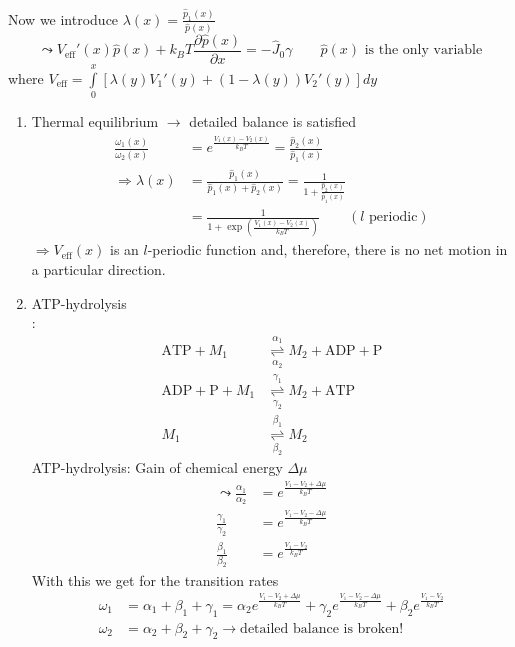 Now we introduce $\lambda(x)=\frac{\hat{p}_1(x)}{\hat{p}(x)}$
\begin{equation*}
	\leadsto V_\text{eff}'(x)\hat{p}(x)+k_BT\frac{\partial\hat{p}(x)}{\partial x}=-\hat{J}_0\gamma \qquad \text{$\hat{p}(x)$ is the only variable}
\end{equation*}
where $V_\text{eff}=\int\limits_0^x\left[\lambda(y)V_1'(y)+(1-\lambda(y))V_2'(y)\right]dy$
\begin{enumerate}[label={\arabic*)}]
	\item Thermal equilibrium $\to$ detailed balance is satisfied
		\begin{align*}
			\frac{\omega_1(x)}{\omega_2(x)}&=e^{\frac{V_1(x)-V_2(x)}{k_BT}}=\frac{\hat{p}_2(x)}{\hat{p}_1(x)}\\
			\Rightarrow \lambda(x)&=\frac{\hat{p}_1(x)}{\hat{p}_1(x)+\hat{p}_2(x)}=\frac{1}{1+\frac{\hat{p}_2(x)}{\hat{p}_1(x)}}\\
			&=\frac{1}{1+\exp\left(\frac{V_1(x)-V_2(x)}{k_BT}\right)} \qquad \left(l\text{ periodic}\right)
		\end{align*}
		$\Rightarrow V_\text{eff}(x)$ is an $l$-periodic function and, therefore, there is no net motion in a particular direction.
	\item ATP-hydrolysis\\
		\textbf{\underline{}}:
		\begin{align*}
			\text{ATP}+M_1&\overset{\alpha_1}{\underset{\alpha_2}{\rightleftharpoons}} M_2+\text{ADP}+\text{P}\\
			\text{ADP}+\text{P}+M_1&\overset{\gamma_1}{\underset{\gamma_2}{\rightleftharpoons}} M_2+\text{ATP}\\
			M_1&\overset{\beta_1}{\underset{\beta_2}{\rightleftharpoons}}M_2
		\end{align*}
		ATP-hydrolysis: Gain of chemical energy $\Delta\mu$
		\begin{align*}
			\leadsto \frac{\alpha_1}{\alpha_2}&=e^{\frac{V_1-V_2+\Delta\mu}{k_BT}}\\
			\frac{\gamma_1}{\gamma_2}&=e^{\frac{V_1-V_2-\Delta\mu}{k_BT}}\\
			\frac{\beta_1}{\beta_2}&=e^{\frac{V_1-V_2}{k_BT}}
		\end{align*}
		With this we get for the transition rates
		\begin{align*}
			\omega_1&=\alpha_1+\beta_1+\gamma_1=\alpha_2e^\frac{V_1-V_2+\Delta\mu}{k_BT}+\gamma_2e^\frac{V_1-V_2-\Delta\mu}{k_BT}+\beta_2e^\frac{V_1-V_2}{k_BT}\\
			\omega_2&=\alpha_2+\beta_2+\gamma_2 \to \text{detailed balance is broken!}

\end{align*}
\end{enumerate}
